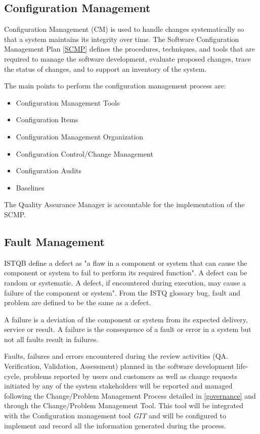 \documentclass{template/openetcs_article}
\begin{document}
\subsection{Configuration Management}

Configuration Management (CM) is used to handle changes systematically so that a system maintains its integrity over time. The Software Configuration Management Plan  \href{https://github.com/openETCS/governance/blob/master/SCMP/SCMP_0.0.0.pdf}{[SCMP]} defines the procedures, techniques, and tools that are required to manage the software development, evaluate proposed changes, trace the status of changes, and to support an inventory of the system. 

The main points to perform the configuration management process are:

\vspace{-10pt}
\begin{itemize}
\item Configuration Management Tools
\item Configuration Items
\item Configuration Management Organization
\item Configuration Control/Change Management
\item Configuration Audits
\item Baselines
\end{itemize}

The Quality Assurance Manager is accountable for the implementation of the SCMP.

\subsection{Fault Management}

ISTQB define a defect as "a flaw in a component or system that can cause the component or system to fail to perform its required function". A defect can be random or systematic. A defect, if encountered during execution, may cause a failure of the component or system". From the ISTQ glossary bug, fault and problem are defined to be the same as a defect.

A failure is a deviation of the component or system from its expected delivery, service or result. A failure is the consequence of a fault or error in a system but not all faults result in failures.

Faults, failures and errors encountered during the review activities (QA. Verification, Validation, Assessment) planned in the software development life-cycle, problems reported by users and customers as well as change requests initiated by any of the system stakeholders will be reported and managed following the Change/Problem Management Process  \citep{emp} detailed in \href{https://github.com/openETCS/governance/tree/master/Change-Problem%20Process}{[governance]} and through the Change/Problem Management Tool. This tool will be integrated with the Configuration management tool {\it GIT} and will be configured to implement and record all the information generated during the process.
\end{document}

